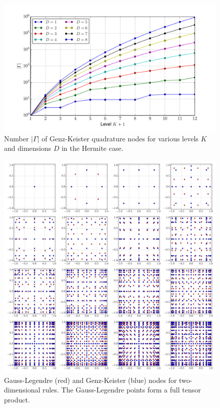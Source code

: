 \documentclass[a4paper,10pt]{article}
\begin{document}
\begin{figure}
  \centering
  \includegraphics[width=\linewidth]{./img/number_nodes_levdim_hermitephy.pdf}
  \caption{Number $|\Gamma|$ of Genz-Keister quadrature nodes for various
  levels $K$ and dimensions $D$ in the Hermite case.}
  \label{fig:number_nodes_levdim_hermitephy}
\end{figure}

\clearpage

\begin{figure}
  \centering
  \includegraphics[width=\linewidth]{./img/gk_legendre_nodes_2d.pdf}
  \caption{Gauss-Legendre (red) and Genz-Keister (blue) nodes for
  two-dimensional rules. The Gauss-Legendre points form a full tensor
  product.}
  \label{fig:gk_legendre_nodes_2d}
\end{figure}
\end{document}
